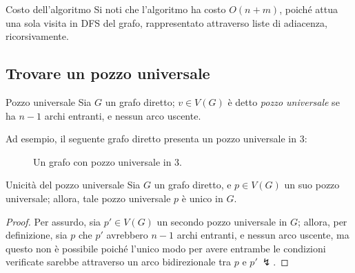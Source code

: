 \documentclass[a4paper, 12pt]{report}
\begin{document}
    \begin{framedobs}{Costo dell'algoritmo}
        Si noti che l'algoritmo ha costo $O(n + m)$, poiché attua una sola visita in DFS del grafo, rappresentato attraverso liste di adiacenza, ricorsivamente.
    \end{framedobs}

    \subsection{Trovare un pozzo universale}

    \begin{frameddefn}{Pozzo universale}
        Sia $G$ un grafo diretto; $v \in V(G)$ è detto \textit{pozzo universale} se ha $n - 1$ archi entranti, e nessun arco uscente.
    \end{frameddefn}

    \begin{example}
        Ad esempio, il seguente grafo diretto presenta un pozzo universale in $3$:

        \begin{figure}[H]
            \centering
            \caption{Un grafo con pozzo universale in $3$.}
        \end{figure}
    \end{example}

    \begin{framedthm}{Unicità del pozzo universale}
        Sia $G$ un grafo diretto, e $p \in V(G)$ un suo pozzo universale; allora, tale pozzo universale $p$ è unico in $G$.
    \end{framedthm}

    \begin{proof}
        Per assurdo, sia $p' \in V(G)$ un secondo pozzo universale in $G$; allora, per definizione, sia $p$ che $p'$ avrebbero $n - 1$ archi entranti, e nessun arco uscente, ma questo non è possibile poiché l'unico modo per avere entrambe le condizioni verificate sarebbe attraverso un arco bidirezionale tra $p$ e $p' \ \lightning$.
    \end{proof}
\end{document}
